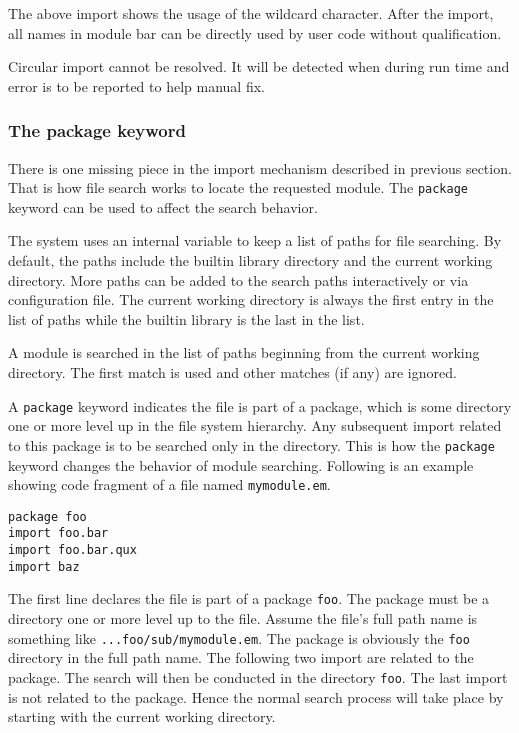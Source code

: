\documentclass[10pt,a4paper]{article}
\begin{document}
The above import shows the usage of the wildcard character. 
After the import, all names in module bar can be directly used by
user code without qualification.

Circular import cannot be resolved. 
It will be detected when during run time and error is to be reported
to help manual fix.

\subsubsection{The package keyword}
There is one missing piece in the import mechanism described in previous
section.
That is how file search works to locate the requested module.
The \lstinline$package$ keyword can be used to affect the search behavior.

The system uses an internal variable to keep a list of paths for file
searching. By default, the paths include the builtin library directory and
the current working directory. More paths can be added to the search
paths interactively or via configuration file. The current working directory
is always the first entry in the list of paths while the builtin library 
is the last in the list.

A module is searched in the list of paths beginning from the current
working directory. The first match is used and other matches (if any)
are ignored.

A \lstinline$package$ keyword indicates the file is part of
a package, which is some directory one or more level up in the file system
hierarchy. 
Any subsequent import related to this package is to be searched
only in the directory. This is how the \lstinline$package$ keyword
changes the behavior of module searching. 
Following is an example showing code fragment of a file named 
\lstinline$mymodule.em$.

\begin{lstlisting}[caption=Example of the package keyword]
package foo
import foo.bar
import foo.bar.qux
import baz
\end{lstlisting}

The first line declares the file is part of a package \lstinline$foo$.
The package must be a directory one or more level up to the file.
Assume the file's full path name is something like 
\verb$...foo/sub/mymodule.em$. The package is obviously the 
\verb$foo$ directory in the full path name. 
The following two import are related to the package. 
The search will then be conducted in the directory \verb$foo$.
The last import is not related to the package. 
Hence the normal search process will take place by starting with
the current working directory.
\end{document}
